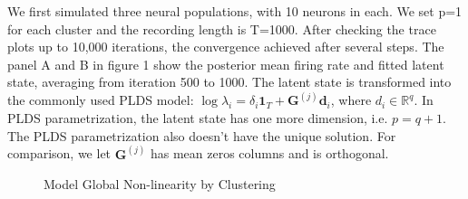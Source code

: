 \documentclass{article}
\begin{document}
	We first simulated three neural populations, with 10 neurons in each. We set p=1 for each cluster and the recording length is T=1000. After checking the trace plots up to 10,000 iterations, the convergence achieved after several steps. The panel A and B in figure 1 show the posterior mean firing rate and fitted latent state, averaging from iteration 500 to 1000. The latent state is transformed into the commonly used PLDS model: $\log \lambda_i = \delta_i\bm{1}_T + \bm{G}^{(j)}\bm{d}_i$, where $d_i\in \mathbb{R}^q$. In PLDS parametrization, the latent state has one more dimension, i.e. $p=q+1$. The PLDS parametrization also doesn't have the unique solution. For comparison, we let $\bm{G}^{(j)}$ has mean zeros columns and is orthogonal.
	
	\begin{figure}[h!]
		\centering
		
		\caption{Model Global Non-linearity by Clustering}
	\end{figure}
	
\end{document}
